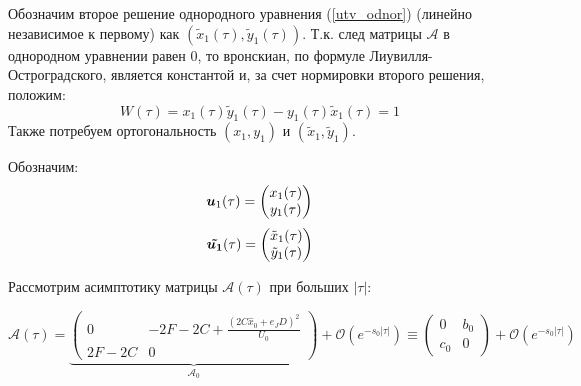 Обозначим второе решение однородного уравнения (\ref{utv_odnor}) (линейно независимое к первому) как $(\tilde x_1 (\tau), \tilde y_1 (\tau))$. Т.к. след матрицы $\mathcal{A}$ в однородном уравнении равен 0, то вронскиан, по формуле Лиувилля-Остроградского, является константой и, за счет нормировки второго решения, положим:
$$W(\tau) = x_1(\tau) \tilde y_1 (\tau) - y_1 (\tau) \tilde x_1 (\tau) = 1$$
Также потребуем ортогональность $(x_1, y_1)$ и $(\tilde x_1, \tilde y_1)$.




Обозначим:
$$\boldsymbol{u}_1(\tau) = \begin{pmatrix} x_1(\tau) \\ y_1(\tau) \end{pmatrix}$$
$$\boldsymbol{ \tilde{u_1}}(\tau) = \begin{pmatrix} \tilde x_1(\tau) \\ \tilde y_1(\tau) \end{pmatrix}$$

Рассмотрим асимптотику матрицы $\mathcal{A}(\tau)$ при больших $|\tau|$:

\begin{equation}
\mathcal{A}(\tau) = \underbrace{\begin{pmatrix} 
0 & -2F-2C + \frac{(2C \hat x_0 + e_J D)^2}{U_0}\\
2F-2C & 0
\end{pmatrix}}_{\mathcal{A}_0} + \mathcal{O}(e^{-s_0 |\tau|}) \equiv 
\begin{pmatrix} 
0 & b_0\\
c_0 & 0
\end{pmatrix} + \mathcal{O}(e^{-s_0 |\tau|})
\end{equation}

